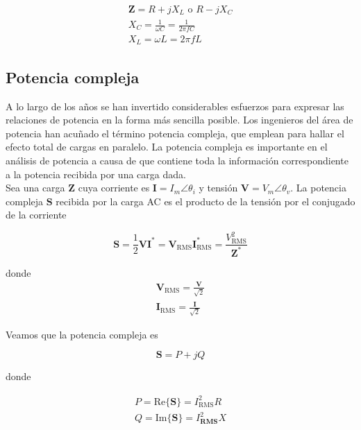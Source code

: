 \begin{eqnarray*}
\mathbf{Z} = R + j X_L \text{ o } R-jX_C \\
X_C = \frac{1}{\omega C} = \frac{1}{2 \pi f C}\\
X_L = \omega L = 2 \pi f L
\end{eqnarray*}

\subsection{Potencia compleja}

A lo largo de los años se han invertido considerables esfuerzos para expresar las relaciones de potencia en la forma más sencilla posible. Los ingenieros del área de potencia han acuñado el término potencia compleja, que emplean para hallar el efecto total de cargas en paralelo. La potencia compleja es importante en el análisis de potencia a causa de que contiene toda la información correspondiente a la potencia recibida por una carga dada. \\

Sea una carga $\mathbf{Z}$ cuya corriente es $\mathbf{I} = I_m \angle \theta_i$ y tensión $\mathbf{V}=V_m \angle \theta_v$. La potencia compleja $\mathbf{S}$ recibida por la carga AC es el producto de la tensión por el conjugado de la corriente

\begin{equation*}
\mathbf{S} = \frac{1}{2}\mathbf{V} \mathbf{I}^* = \mathbf{V}_{\text{RMS}} \mathbf{I}_{\text{RMS}}^{*} = \frac{V_\text{RMS}^2}{\mathbf{Z}^*}
\end{equation*}

donde 
\begin{eqnarray*}
\mathbf{V}_{\text{RMS}} = \frac{\mathbf{V}}{\sqrt{2}} \\
\mathbf{I}_{\text{RMS}} = \frac{\mathbf{I}}{\sqrt{2}}
\end{eqnarray*}

Veamos que la potencia compleja es

\begin{equation*}
\mathbf{S} = P + j Q
\end{equation*}

donde

\begin{eqnarray*}
P = \text{Re}\{ \mathbf{S} \} = I_\text{RMS}^2 R \\
Q = \text{Im} \{ \mathbf{S} \} = I_\textbf{RMS}^2 X
\end{eqnarray*}

